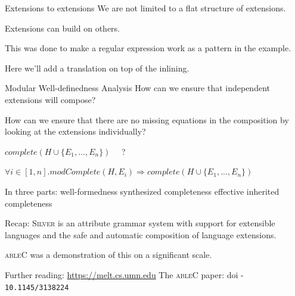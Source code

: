 \documentclass[11pt,aspectratio=169]{beamer}
\begin{document}
\begin{frame}{Extensions to extensions}
\biA
\x We are not limited to a flat structure of extensions.

\x Extensions can build on others.

\x This was done to make a regular expression work as a pattern in the
 example.

\x Here we'll add a translation on top of the inlining.
\ei
\end{frame}

\begin{frame}[t]{Modular Well-definedness Analysis}
How can we ensure that independent extensions will compose?

\medskip
How can we ensure that there are no missing equations in the
composition by looking at the extensions individually?

\bigskip

$\mathit{complete} ( H \cup \{ E_1, ... , E_n \} ) $ \ \ ?

\bigskip

$\forall i \in [1,n] . \mathit{modComplete}(H, E_i) 
 \Rightarrow \mathit{complete}( H \cup \{ E_1, ..., E_n \} )$

\bigskip
In three parts:
\be
 \x well-formedness
 \x synthesized completeness
 \x effective inherited completeness
\ee
\end{frame}


\begin{frame}{Recap:}
\biA
\x \textsc{Silver} is an attribute grammar system with support for extensible
languages and the safe and automatic composition of
 language extensions. 

\x \textsc{ableC} was a demonstration of this on a significant scale.

\x Further reading:
\bi \x \url{https://melt.cs.umn.edu}
    \x The \textsc{ableC} paper: doi - \texttt{10.1145/3138224}
\ei
\ei
\end{frame}
\end{document}
